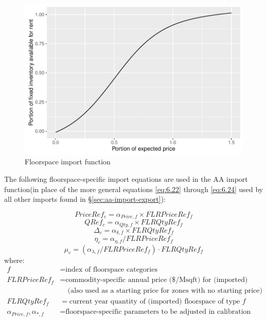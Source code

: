 \begin{figure}
\centering
\includegraphics[scale=0.77]{aa/aa-floorspace-import-function}
\caption{Floorspace import function}\label{fig:aa-floorspace-import}
\end{figure}

The following floorspace-specific import equations are used in the AA import function(in place of the more general equations \ref{eq:6.22} through \ref{eq:6.24} used by all other imports found in \S\ref{sec:aa-import-export}):

\begin{equation}\label{eq:6.25}
PriceRef_c = \alpha_{Price, f} \times FLRPriceRef_f
\end{equation}
\begin{equation}\label{eq:6.26}
QRef_c = \alpha_{Qty,f} \times FLRQtyRef_f
\end{equation}
\begin{equation}\label{eq:6.27}
\Delta_c = \alpha_{\delta,f} \times FLRQtyRef_f
\end{equation}
\begin{equation}\label{eq:6.28}
\eta_c = \alpha_{\eta,f} / FLRPriceRef_f
\end{equation}
\begin{equation}\label{eq:6.29}
\mu_c = (\alpha_{\lambda,f} / FLRPriceRef_f) \cdot FLRQtyRef_f
\end{equation}
\noindent where:
\begin{align*}
f &= \text{index of floorspace categories} \\
FLRPriceRef_f &= \text{commodity-specific annual price (\$/Msqft) for (imported) floorspace} \\
 &~~~~~\text{(also used as a starting price for zones with no starting price)} \\
FLRQtyRef_f &= \text{current year quantity of (imported) floorspace of type $f$} \\
\alpha_{Price,f}, \alpha_{*,f} &= \text{floorspace-specific parameters to be adjusted in calibration}
\end{align*}

